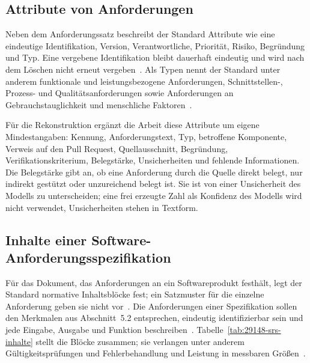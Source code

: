 \documentclass[11pt,a4paper]{report}
\begin{document}
\subsection{Attribute von Anforderungen}
\label{subsec:anforderungsattribute}

Neben dem Anforderungssatz beschreibt der Standard Attribute wie eine
eindeutige Identifikation, Version, Verantwortliche, Priorität, Risiko,
Begründung und Typ. Eine vergebene Identifikation bleibt dauerhaft
eindeutig und wird nach dem Löschen nicht erneut
vergeben~\cite[Abschn.~5.2.8.1--5.2.8.2]{iso29148}. Als Typen nennt der
Standard unter anderem funktionale und leistungsbezogene Anforderungen,
Schnittstellen-, Prozess- und Qualitätsanforderungen sowie
Anforderungen an Gebrauchstauglichkeit und menschliche
Faktoren~\cite[Abschn.~5.2.8.3]{iso29148}.

Für die Rekonstruktion ergänzt die Arbeit diese Attribute um eigene
Mindestangaben: Kennung, Anforderungstext, Typ, betroffene Komponente,
Verweis auf den Pull Request, Quellausschnitt, Begründung,
Verifikationskriterium, Belegstärke, Unsicherheiten und fehlende
Informationen. Die Belegstärke gibt an, ob eine Anforderung durch die
Quelle direkt belegt, nur indirekt gestützt oder unzureichend belegt
ist. Sie ist von einer Unsicherheit des Modells zu unterscheiden; eine
frei erzeugte Zahl als Konfidenz des Modells wird nicht verwendet,
Unsicherheiten stehen in Textform.

\subsection{Inhalte einer Software-Anforderungsspezifikation}
\label{subsec:srs-inhalte}

Für das Dokument, das Anforderungen an ein Softwareprodukt festhält,
legt der Standard normative Inhaltsblöcke fest; ein Satzmuster für die
einzelne Anforderung geben sie nicht vor~\cite[Abschn.~8.5.1, 9.1 und
9.6]{iso29148}. Die Anforderungen einer Spezifikation sollen den
Merkmalen aus Abschnitt~5.2 entsprechen, eindeutig identifizierbar
sein und jede Eingabe, Ausgabe und Funktion
beschreiben~\cite[Abschn.~9.6.10]{iso29148}.
Tabelle~\ref{tab:29148-srs-inhalte} stellt die Blöcke zusammen; sie
verlangen unter anderem Gültigkeitsprüfungen und Fehlerbehandlung
\cite[Abschn.~9.6.12]{iso29148} und Leistung in messbaren
Größen~\cite[Abschn.~9.6.14]{iso29148}.
\end{document}
